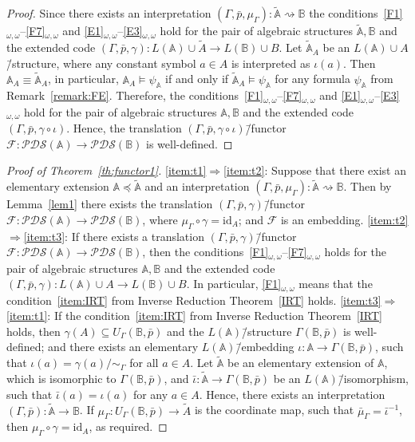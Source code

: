 \documentclass[12pt]{article}
\theoremstyle{definition}
\def\MA{{\mathbb{A}}}
\def\MB{{\mathbb{B}}}
\newcommand{\nsA}{\widetilde{\mathbb A}}
\newcommand{\nsuA}{\widetilde{A}}
\def\F{{\mathcal{F}}}
\def\PDS{{\mathcal{PDS}}}
\def\id{{\mathrm{id}}}
\begin{document}
\begin{proof}
Since there exists an interpretation $(\Gamma,\bar p,\mu_\Gamma)\colon\nsA\rightsquigarrow\MB$ the conditions~\ref{F1}$_{\omega,\omega}$--\ref{F7}$_{\omega,\omega}$ and \ref{E1}$_{\omega,\omega}$--\ref{E3}$_{\omega,\omega}$ hold for the pair of algebraic structures $\nsA,\MB$ and the extended code $(\Gamma,\bar p,\gamma)\colon L(\MA)\cup \nsuA\to L(\MB)\cup B$. Let $\nsA_A$ be an $L(\MA)\cup A$\=/structure, where any constant symbol $a\in A$ is interpreted as $\iota(a)$. Then $\MA_A\equiv \nsA_A$, in particular, $\MA_A\models\psi_\MA$ if and only if $\nsA_{A}\models \psi_\MA$ for any formula $\psi_\MA$ from Remark~\ref{remark:FE}. Therefore, the conditions~\ref{F1}$_{\omega,\omega}$--\ref{F7}$_{\omega,\omega}$ and \ref{E1}$_{\omega,\omega}$--\ref{E3}$_{\omega,\omega}$ hold for the pair of algebraic structures $\MA,\MB$ and the extended code $(\Gamma,\bar p,\gamma\circ\iota)$. Hence, the translation $(\Gamma,\bar p,\gamma\circ\iota)$\=/functor $\F\colon \PDS(\MA)\to \PDS(\MB)$ is well-defined.
\end{proof}

\begin{proof}[Proof of Theorem~\ref{th:functor1}]
\ref{item:t1}$\Longrightarrow$\ref{item:t2}: Suppose that there exist an elementary extension $\MA\preceq\nsA$ and an interpretation $(\Gamma,\bar p, \mu_\Gamma)\colon \nsA\rightsquigarrow\MB$. Then by Lemma~\ref{lem1} there exists the translation $(\Gamma,\bar p,\gamma)$\=/functor $\F\colon \PDS(\MA)\to \PDS(\MB)$, where $\mu_\Gamma\circ\gamma=\id_A$; and $\F$ is an embedding. \ref{item:t2}$\Longrightarrow$\ref{item:t3}: If there exists a translation $(\Gamma,\bar p,\gamma)$\=/functor $\F\colon\PDS(\MA)\to \PDS(\MB)$, then the  conditions~\ref{F1}$_{\omega,\omega}$--\ref{F7}$_{\omega,\omega}$ holds for the pair of algebraic structures $\MA,\MB$ and the extended code $(\Gamma,\bar p,\gamma)\colon L(\MA)\cup A\to L(\MB)\cup B$. In particular, \ref{F1}$_{\omega,\omega}$ means that the condition~\ref{item:IRT} from Inverse Reduction Theorem~\ref{IRT} holds.  \ref{item:t3}$\Longrightarrow$\ref{item:t1}: If the condition~\ref{item:IRT} from Inverse Reduction Theorem~\ref{IRT} holds, then $\gamma(A)\subseteq U_\Gamma(\MB,\bar p)$ and the $L(\MA)$\=/structure $\Gamma(\MB,\bar p)$ is well-defined; and there exists an elementary $L(\MA)$\=/embedding $\iota\colon \MA\to \Gamma(\MB,\bar p)$, such that $\iota(a)=\gamma(a)/{\sim_\Gamma}$ for all $a\in A$. Let $\nsA$ be an elementary extension of $\MA$, which is isomorphic to $\Gamma(\MB,\bar p)$, and $\bar \iota\colon \nsA\to \Gamma(\MB,\bar p)$ be an $L(\MA)$\=/isomorphism, such that $\bar\iota(a)=\iota(a)$ for any $a\in A$. Hence, there exists an interpretation $(\Gamma,\bar p)\colon\nsA\to\MB$. If $\mu_\Gamma\colon U_\Gamma(\MB,\bar p)\to \nsuA$ is the coordinate map, such that $\bar\mu_\Gamma=\bar\iota^{-1}$, then $\mu_\Gamma\circ\gamma=\id_A$, as required.
\end{proof}
\end{document}

